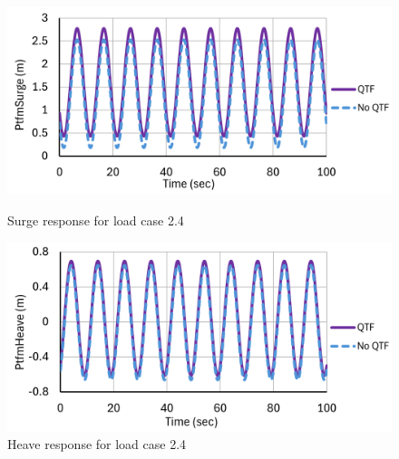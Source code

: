 \documentclass[a4paper, 11pt]{article}
\begin{document}
\begin{figure}[H]
    \begin{minipage}{0.49\textwidth}
        \centering
        \includegraphics[width=1\textwidth]{2.4_surge.png}
        \caption{\small Surge response for load case 2.4} 
        \label{fig:2.4_surge}
    \end{minipage}
    \hfill
    \begin{minipage}{0.49\textwidth}
        \centering
        \vspace{-0.3cm}
        \includegraphics[width=1\textwidth]{2.4_heave.png}
        \caption{\small Heave response for load case 2.4}
        \label{fig:2.4_heave}
    \end{minipage}
\end{figure}
\end{document}
